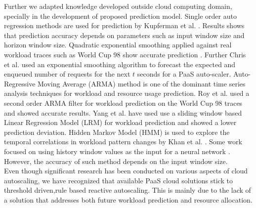 Further we adapted knowledge developed outside cloud computing domain, specially in the development of proposed prediction model. Single order auto regression methods are used for prediction by Kupferman et al. \cite{Kupferman_2009}. Results shows that prediction accuracy depends on parameters such as input window size and horizon window size. Quadratic exponential smoothing applied against real workload traces such as World Cup 98 \cite{WorldCup_1998} show accurate prediction \cite{Mi_2010}. Further Chris et al. \cite{Bunch_2012} used an exponential smoothing algorithm to forecast the expected and enqueued number of requests for the next $t$ seconds for a PaaS auto-scaler. Auto-Regressive Moving Average (ARMA) method is one of the dominant time series analysis techniques for workload and resource usage prediction. Roy et al. \cite{Roy_2011} used a second order ARMA filter for workload prediction on the World Cup 98 traces and showed accurate results. Yang et al. \cite{Yang_2013} have used use a sliding window based Linear Regression Model (LRM) for workload prediction and showed a lower prediction deviation. Hidden Markov Model (HMM) is used to explore the temporal correlations in workload pattern changes by Khan et al. \cite{Khan_2012}. Some work focused on using history window values as the input for a neural network \cite{Islam_2012}. However, the accuracy of such method depends on the input window size.\\

Even though significant research has been conducted on various aspects of cloud autoscaling, we have recognized that available PaaS cloud solutions stick to threshold driven,rule based reactive autoscaling. This is mainly due to the lack of a solution that addresses both future workload prediction and resource allocation.
